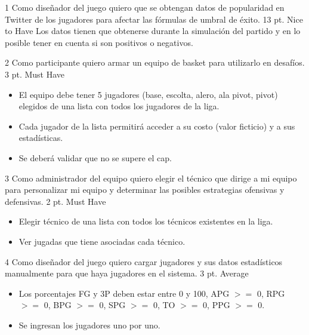 


\simplestory
{1}
{Como diseñador del juego quiero que se obtengan datos de popularidad en Twitter de los jugadores para afectar las fórmulas de umbral de éxito.}
{13 pt.}
{Nice to Have}
{Los datos tienen que obtenerse durante la simulación del partido y en lo posible tener en cuenta si son positivos o negativos.}

\vspace{1cm}

\simplestory
{2}
{Como participante quiero armar un equipo de basket para utilizarlo en desafíos.}
{3 pt.}
{Must Have}
{\begin{itemize}
\item El equipo debe tener 5 jugadores (base, escolta, alero, ala pivot, pivot) elegidos de una lista con todos los jugadores de la liga.
\item Cada jugador de la lista permitirá acceder a su costo (valor ficticio) y a sus estadísticas.
\item Se deberá validar que no se supere el cap.
\end{itemize}}

\vspace{1cm}

\simplestory
{3}
{Como administrador del equipo quiero elegir el técnico que dirige a mi equipo para personalizar mi equipo y determinar las posibles estrategias ofensivas y defensivas.}
{2 pt.}
{Must Have}
{\begin{itemize}
\item Elegir técnico de una lista con todos los técnicos existentes en la liga.
\item Ver jugadas que tiene asociadas cada técnico.
\end{itemize}}

\vspace{1cm}

\simplestory
{4}
{Como diseñador del juego quiero cargar jugadores y sus datos estadísticos manualmente para que haya jugadores en el sistema.}
{3 pt.}
{Average}
{\begin{itemize}
\item Los porcentajes FG y 3P deben estar entre 0 y 100, APG $>=$ 0, RPG $>=$ 0, BPG $>=$ 0, SPG $>=$ 0, TO $>=$ 0, PPG $>=$ 0.
\item Se ingresan los jugadores uno por uno.
\end{itemize}}

